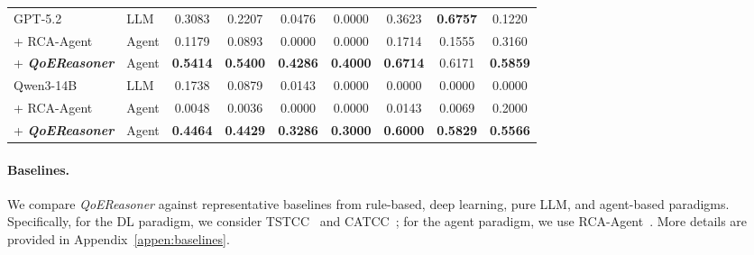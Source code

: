 \documentclass[sigconf,10pt]{acmart} %
\begin{document}
\begin{table}
{\begin{tabular}{l l
    c c c c |
    c c c}
      \midrule
      GPT-5.2 & LLM
      & 0.3083 & 0.2207 & 0.0476 & 0.0000
      & 0.3623 & \textbf{0.6757} & 0.1220 \\

      + RCA-Agent~\cite{xu2025openrca} & Agent
      & 0.1179 & 0.0893 & 0.0000 & 0.0000
      & 0.1714 & 0.1555 & 0.3160 \\

      + \textit{\textbf{QoEReasoner}} & Agent
      & \textbf{0.5414} & \textbf{0.5400} & \textbf{0.4286} & \textbf{0.4000}
      & \textbf{0.6714} & 0.6171 & \textbf{0.5859} \\

      \midrule
      Qwen3-14B & LLM
      & 0.1738 & 0.0879 & 0.0143 & 0.0000
      & 0.0000 & 0.0000 & 0.0000 \\

      + RCA-Agent~\cite{xu2025openrca} & Agent
      & 0.0048 & 0.0036 & 0.0000 & 0.0000
      & 0.0143 & 0.0069 & 0.2000 \\

      + \textit{\textbf{QoEReasoner}} & Agent
      & \textbf{0.4464} & \textbf{0.4429} & \textbf{0.3286} & \textbf{0.3000}
      & \textbf{0.6000} & \textbf{0.5829} & \textbf{0.5566} \\

      \bottomrule
    \end{tabular}
    }
\end{table}

\paragraph{Baselines.}
We compare \textit{QoEReasoner} against representative baselines from rule-based, deep learning, pure LLM, and agent-based paradigms. Specifically, for the DL paradigm, we consider TSTCC~\cite{eldele2021ts2vec} and CATCC~\cite{eldele2023self}; for the agent paradigm, we use RCA-Agent~\cite{xu2025openrca}. More details are provided in Appendix~\ref{appen:baselines}.
\end{document}
